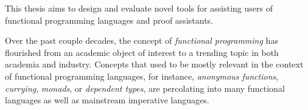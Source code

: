 This thesis aims to design and evaluate novel tools for assisting users of
functional programming languages and proof assistants.

Over the past couple decades, the concept of \emph{functional programming} has
flourished from an academic object of interest to a trending topic in both
academia and industry.  Concepts that used to be mostly relevant in the context
of functional programming languages, for instance, \emph{anonymous functions},
\emph{currying}, \emph{monads}, or \emph{dependent types}, are percolating into
many functional languages as well as mainstream imperative languages.
